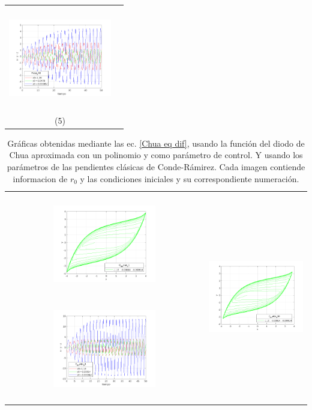 \documentclass{rbf}
\begin{document}
\begin{table}[h]
\begin{tabular}{c c}
        \includegraphics[width=4.5cm,height=4.5cm]{Mat_r0_pwl_poly/timeseriesPolyr_056.png}\\
        (5) \\
    \end{tabular}
\end{table}

\begin{table}[h]
    \centering
    \caption{\label{tab:parámetros de las pendientes clásicas de Conde-Rámirez} Gráficas obtenidas mediante las ec. \ref{Chua eq dif}, usando la función del diodo de Chua aproximada con un polinomio y \gamma como parámetro de control. Y usando los parámetros de las pendientes clásicas de Conde-Rámirez. Cada imagen contiende informacion de $r_0$ y las condiciones iniciales y su correspondiente numeración.\\}
    \begin{tabular}{c c}
        \hline    
        \includegraphics[width=4.5cm,height=4.5cm]{Mat_C_R_r0_poly1/phaseESPACEC_R_Polyr_01.png}
        \includegraphics[width=4.5cm,height=4.5cm]{Mat_C_R_r0_poly1/timeseriesC_R_Polyr_01.png}&
        \includegraphics[width=4.5cm,height=4.5cm]{Mat_C_R_r0_poly1/phaseESPACEC_R_Polyr_010.png}

\end{tabular}
\end{table}
\end{document}
